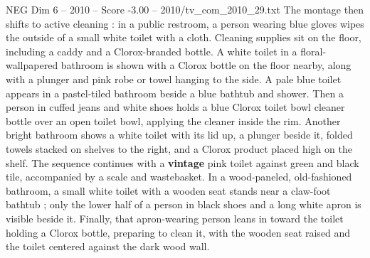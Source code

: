 \begin{textsample}{NEG Dim 6 – 2010 – Score -3.00 – 2010/tv\_com\_2010\_29.txt}
The montage then shifts to active cleaning : in a public restroom, a person wearing blue gloves wipes the outside of a small white toilet with a cloth.
Cleaning supplies sit on the floor, including a caddy and a Clorox-branded bottle.
A white toilet in a floral-wallpapered bathroom is shown with a Clorox bottle on the floor nearby, along with a plunger and pink robe or towel hanging to the side.
A pale blue toilet appears in a pastel-tiled bathroom beside a blue bathtub and shower.
Then a person in cuffed jeans and white shoes holds a blue Clorox toilet bowl cleaner bottle over an open toilet bowl, applying the cleaner inside the rim.
Another bright bathroom shows a white toilet with its lid up, a plunger beside it, folded towels stacked on shelves to the right, and a Clorox product placed high on the shelf.
The sequence continues with a \textbf{vintage} pink toilet against green and black tile, accompanied by a scale and wastebasket.
In a wood-paneled, old-fashioned bathroom, a small white toilet with a wooden seat stands near a claw-foot bathtub ; only the lower half of a person in black shoes and a long white apron is visible beside it.
Finally, that apron-wearing person leans in toward the toilet holding a Clorox bottle, preparing to clean it, with the wooden seat raised and the toilet centered against the dark wood wall.

\end{textsample}
